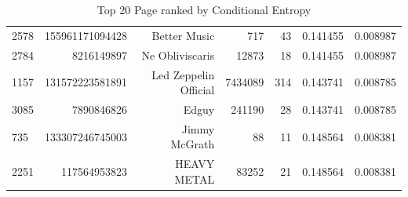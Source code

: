 \begin{table}
\begin{tabular}{| >{\small}l | >{\small}r | >{\small}r | >{\small}r | >{\small}r | >{\small}r |>{\small}r |}
2578 &  155961171094428 &           Better Music &      717 &       43 &             0.141455 &            0.008987 \\
2784 &       8216149897 &        Ne Obliviscaris &    12873 &       18 &             0.141455 &            0.008987 \\
1157 &  131572223581891 &  Led Zeppelin Official &  7434089 &      314 &             0.143741 &            0.008785 \\
3085 &       7890846826 &                  Edguy &   241190 &       28 &             0.143741 &            0.008785 \\
735  &  133307246745003 &          Jimmy McGrath &       88 &       11 &             0.148564 &            0.008381 \\
2251 &     117564953823 &            HEAVY METAL &    83252 &       21 &             0.148564 &            0.008381 \\
\hline
\end{tabular}
\caption{Top 20 Page ranked by Conditional Entropy}
\label {Top 20 Page ranked by Conditional Entropy}
\end{table}
\cleardoublepage
